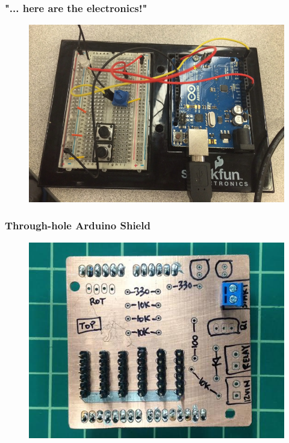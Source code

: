 \documentclass{beamer}
\begin{document}
\begin{frame}
\frametitle{"... here are the electronics!"}
\begin{figure}
\includegraphics[width=0.9\linewidth]{breadboard.png}
\end{figure}
\end{frame}
\begin{frame}
\frametitle{Through-hole Arduino Shield}
\begin{figure}
\includegraphics[width=0.9\linewidth]{ovenboard-top.png}
\end{figure}
\end{frame}
\end{document}
